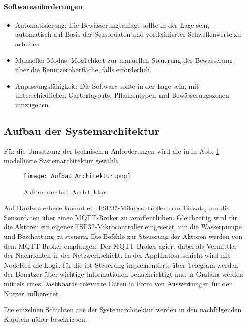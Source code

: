 \paragraph{Softwareanforderungen}
\begin{itemize}
  \item Automatisierung: Die Bewässerungsanlage sollte in der Lage sein, automatisch auf Basis der Sensordaten und vordefinierter Schwellenwerte zu arbeiten
  \item Manueller Modus: Möglichkeit zur manuellen Steuerung der Bewässerung über die Benutzeroberfläche, falls erforderlich
  \item Anpassungsfähigkeit: Die Software sollte in der Lage sein, mit unterschiedlichen Gartenlayouts, Pflanzentypen und Bewässerungszonen umzugehen
\end{itemize}


\subsection{Aufbau der Systemarchitektur}

Für die Umsetzung der technischen Anforderungen wird die in in Abb. \ref{fig:iotschichten} modellierte Systemarchitektur gewählt.

\begin{figure}[h]
  \centering
  \texttt{[image: Aufbau\_Architektur.png]}
  \caption{Aufbau der IoT-Architektur}\label{fig:iotschichten}
\end{figure}

Auf Hardwareebene kommt ein ESP32-Mikrocontroller zum Einsatz, um die Sensordaten über einen MQTT-Broker zu veröffentlichen. Gleichzeitig wird für die Aktoren ein eigener ESP32-Mikrocontroller eingesetzt, um die Wasserpumpe und Beschattung zu steuern. Die Befehle zur Steuerung der Aktoren werden von dem MQTT-Broker empfangen. Der MQTT-Broker agiert dabei als Vermittler der Nachrichten in der Netzwerkschicht. In der Applikationsschicht wird mit NodeRed die Logik für die \gls{iot}-Steuerung implementiert, über Telegram werden der Benutzer über wichtige Informationen benachrichtigt und in Grafana werden mittels eines Dashboards relevante Daten in Form von Auswertungen für den Nutzer aufbereitet.

Die einzelnen Schichten aus der Systemarchitektur werden in den nachfolgenden Kapiteln näher beschrieben.